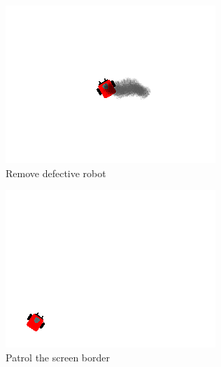 \documentclass[]{article}
\begin{document}
\begin{figure}
	\ContinuedFloat
	\centering
	\begin{subfigure}{0.42\textwidth}
		\centering
		\includegraphics[width=\linewidth]{slide_images/Swarm_Robot_Control_-_Single_Robot_0019.png}
		\caption{Remove defective robot}
		\label{fig:sub1}
	\end{subfigure}%
	\begin{subfigure}{0.42\textwidth}
		\centering
		\includegraphics[width=\linewidth]{slide_images/Swarm_Robot_Control_-_Single_Robot_0021.png}
		\caption{Patrol the screen border}
		\label{fig:sub2}
	\end{subfigure}
	\begin{subfigure}{0.42\textwidth}

\end{subfigure}
\end{figure}
\end{document}
